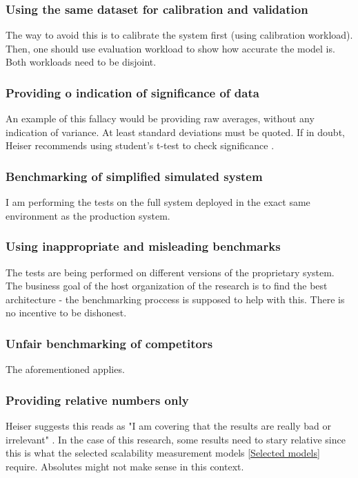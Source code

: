 \documentclass{uvamscse}
\begin{document}
\subsubsection{Using the same dataset for calibration and validation}
The way to avoid this is to calibrate the system first (using calibration workload). Then, one should use evaluation workload to show how accurate the model is. Both workloads need to be disjoint.

\subsubsection{Providing o indication of significance of data}
An example of this fallacy would be providing raw averages, without any indication of variance. At least standard deviations must be quoted. If in doubt, Heiser recommends using student's t-test to check significance \cite{GerHeiBench}.

\subsubsection{Benchmarking of simplified simulated system}
I am performing the tests on the full system deployed in the exact same environment as the production system.

\subsubsection{Using inappropriate and misleading benchmarks}
The tests are being performed on different versions of the proprietary system. The business goal of the host organization of the research is to find the best architecture - the benchmarking proccess is supposed to help with this. There is no incentive to be dishonest.

\subsubsection{Unfair benchmarking of competitors}
The aforementioned applies.

\subsubsection{Providing relative numbers only}
Heiser suggests this reads as "I am covering that the results are really bad or irrelevant" \cite{GerHeiBench}. In the case of this research, some results need to stary relative since this is what the selected scalability measurement models \ref{Selected models} require. Absolutes might not make sense in this context.
\end{document}
